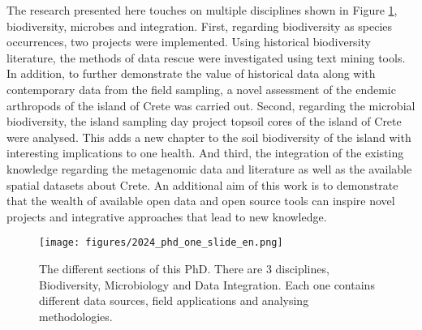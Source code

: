 The research presented here touches on multiple disciplines shown in Figure \ref{fig:phd-one-slide}, 
biodiversity, microbes and integration. 
First, regarding biodiversity as species occurrences, two projects were implemented.
Using historical biodiversity literature, the methods of data rescue were 
investigated using text mining tools. In addition, to further demonstrate the 
value of historical data along with contemporary data from the field sampling, a 
novel assessment of the endemic arthropods of the island of Crete was carried out.
Second, regarding the microbial biodiversity, the island sampling day project 
topsoil cores of the island of Crete were analysed. This adds a new chapter to 
the soil biodiversity of the island with interesting implications to one health.
And third, the integration of the existing knowledge regarding the metagenomic 
data and literature as well as the available spatial datasets about Crete. 
An additional aim of this work is to demonstrate that the wealth of available open data
and open source tools can inspire novel projects and integrative approaches that lead
to new knowledge.

   \begin{figure}[ht]
      \centering
      \texttt{[image: figures/2024\_phd\_one\_slide\_en.png]}
      \caption[Graphical abstract of this PhD]{The different sections of this PhD. There are 3 disciplines, Biodiversity, Microbiology and Data Integration. Each one contains different data sources, field applications and analysing methodologies.}
      \label{fig:phd-one-slide}
   \end{figure}


